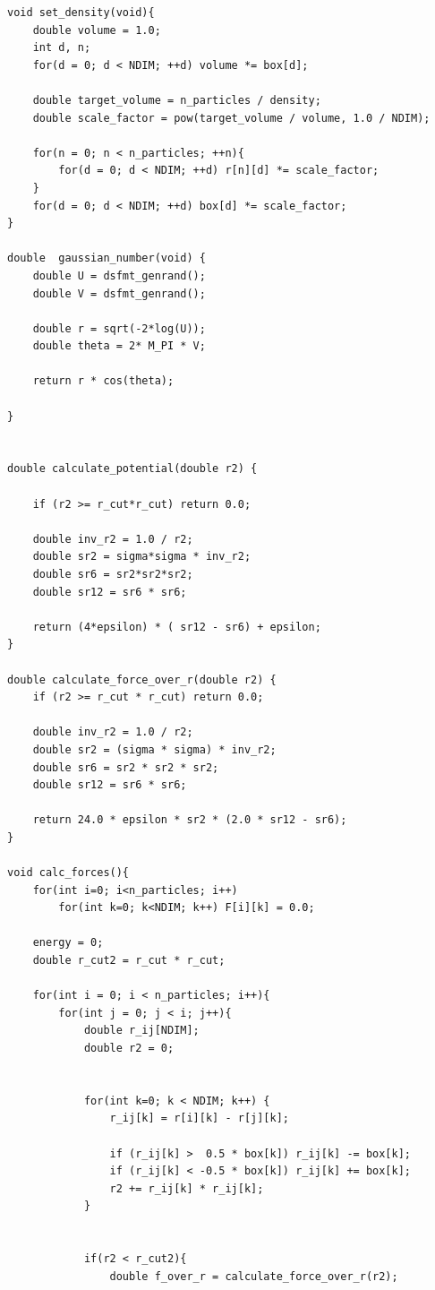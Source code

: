 \begin{lstlisting}[style=Cstyle]
void set_density(void){
    double volume = 1.0;
    int d, n;
    for(d = 0; d < NDIM; ++d) volume *= box[d];

    double target_volume = n_particles / density;
    double scale_factor = pow(target_volume / volume, 1.0 / NDIM);

    for(n = 0; n < n_particles; ++n){
        for(d = 0; d < NDIM; ++d) r[n][d] *= scale_factor;
    }
    for(d = 0; d < NDIM; ++d) box[d] *= scale_factor;
}

double  gaussian_number(void) {
    double U = dsfmt_genrand();
    double V = dsfmt_genrand();

    double r = sqrt(-2*log(U));
    double theta = 2* M_PI * V;

    return r * cos(theta);

}
    

double calculate_potential(double r2) {

    if (r2 >= r_cut*r_cut) return 0.0; 

    double inv_r2 = 1.0 / r2;
    double sr2 = sigma*sigma * inv_r2;
    double sr6 = sr2*sr2*sr2;
    double sr12 = sr6 * sr6;
    
    return (4*epsilon) * ( sr12 - sr6) + epsilon;
}

double calculate_force_over_r(double r2) {
    if (r2 >= r_cut * r_cut) return 0.0; 

    double inv_r2 = 1.0 / r2;                 
    double sr2 = (sigma * sigma) * inv_r2;    
    double sr6 = sr2 * sr2 * sr2;             
    double sr12 = sr6 * sr6;                  
    
    return 24.0 * epsilon * sr2 * (2.0 * sr12 - sr6);
}

void calc_forces(){
    for(int i=0; i<n_particles; i++) 
        for(int k=0; k<NDIM; k++) F[i][k] = 0.0;

    energy = 0;
    double r_cut2 = r_cut * r_cut;

    for(int i = 0; i < n_particles; i++){
        for(int j = 0; j < i; j++){
            double r_ij[NDIM];
            double r2 = 0;
            

            for(int k=0; k < NDIM; k++) {
                r_ij[k] = r[i][k] - r[j][k];
  
                if (r_ij[k] >  0.5 * box[k]) r_ij[k] -= box[k];
                if (r_ij[k] < -0.5 * box[k]) r_ij[k] += box[k];
                r2 += r_ij[k] * r_ij[k];
            }


            if(r2 < r_cut2){
                double f_over_r = calculate_force_over_r(r2); 
                

\end{lstlisting}
